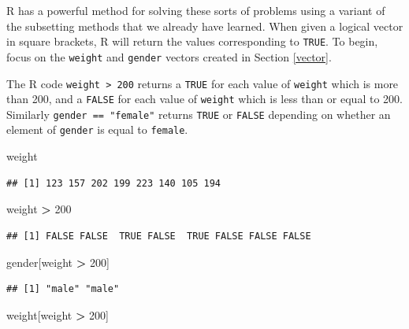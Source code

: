 \documentclass[
]{krantz}
\newenvironment{Shaded}{\begin{snugshade}}{\end{snugshade}}
\newcommand{\DecValTok}[1]{\textcolor[rgb]{0.00,0.00,0.81}{#1}}
\newcommand{\NormalTok}[1]{#1}
\newcommand{\OperatorTok}[1]{\textcolor[rgb]{0.81,0.36,0.00}{\textbf{#1}}}
\newcommand{\StringTok}[1]{\textcolor[rgb]{0.31,0.60,0.02}{#1}}
\begin{document}
R has a powerful method for solving these sorts of problems using a variant of the subsetting methods that we already have learned. When given a logical vector in square brackets, R will return the values corresponding to \texttt{TRUE}.
To begin, focus on the \texttt{weight} and \texttt{gender} vectors created in Section \ref{vector}.

The R code \texttt{weight\ \textgreater{}\ 200} returns a \texttt{TRUE} for each value of \texttt{weight} which is more than 200, and a \texttt{FALSE} for each value of \texttt{weight} which is less than or equal to 200. Similarly \texttt{gender\ ==\ "female"} returns \texttt{TRUE} or \texttt{FALSE} depending on whether an element of \texttt{gender} is equal to \texttt{female}.

\begin{Shaded}
\begin{Highlighting}[]
\NormalTok{weight}
\end{Highlighting}
\end{Shaded}

\begin{verbatim}
## [1] 123 157 202 199 223 140 105 194
\end{verbatim}

\begin{Shaded}
\begin{Highlighting}[]
\NormalTok{weight }\OperatorTok{\textgreater{}}\StringTok{ }\DecValTok{200}
\end{Highlighting}
\end{Shaded}

\begin{verbatim}
## [1] FALSE FALSE  TRUE FALSE  TRUE FALSE FALSE FALSE
\end{verbatim}

\begin{Shaded}
\begin{Highlighting}[]
\NormalTok{gender[weight }\OperatorTok{\textgreater{}}\StringTok{ }\DecValTok{200}\NormalTok{]}
\end{Highlighting}
\end{Shaded}

\begin{verbatim}
## [1] "male" "male"
\end{verbatim}

\begin{Shaded}
\begin{Highlighting}[]
\NormalTok{weight[weight }\OperatorTok{\textgreater{}}\StringTok{ }\DecValTok{200}\NormalTok{]}
\end{Highlighting}
\end{Shaded}
\end{document}
